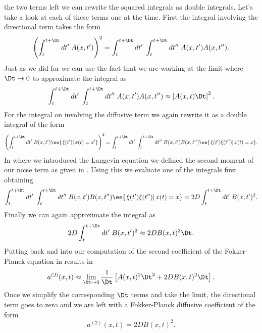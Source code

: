 the two terms left we can rewrite the squared integrals as double integrals.
Let's take a look at each of these terms one at the time. First the integral 
involving the directional term takes the form
\begin{equation}
    \left(  
        \int_t^{t + \Dt} dt'\; A(x, t')
    \right)^2 =
    \int_t^{t + \Dt} dt'\; \int_t^{t + \Dt} dt''\;
    A(x, t') A(x, t'').
\end{equation}
Just as we did for  we can use the fact that we
are working at the limit where $\Dt \rightarrow 0$ to approximate the integral
as 
\begin{equation}
    \int_t^{t + \Dt} dt'\; \int_t^{t + \Dt} dt''\;
    A(x, t') A(x, t'') \approx \left[ A(x, t)  \Dt\right]^2.
    \label{eq_directional_int_approx}
\end{equation}
For the integral on  involving the diffusive term we again
rewrite it as a double integral of the form
\begin{equation}
    \left(
    \int_t^{t + \Dt} dt'\; B(x, t') \ee{\left.\xi(t')
    \right\vert x(t) = x'}
    \right)^2 =
    \int_t^{t + \Dt} dt'\; \int_t^{t + \Dt} dt''\;
    B(x, t') B(x, t'') \ee{\left. \xi(t') \xi(t'') \right\vert x(t) = x}.
\end{equation}
In  where we introduced the Langevin equation we
defined the second moment of our noise term as given in .
Using this we evaluate one of the integrals first obtaining
\begin{equation}
    \int_t^{t + \Dt} dt'\; \int_t^{t + \Dt} dt''\;
    B(x, t') B(x, t'') \ee{\left. \xi(t') \xi(t'') \right\vert x(t) = x} =
    2D \int_t^{t + \Dt} dt'\; B(x, t')^2.
\end{equation}
Finally we can again approximate the integral as
\begin{equation}
    2D \int_t^{t + \Dt} dt'\; B(x, t')^2 \approx 2D B(x, t)^2 \Dt.
    \label{eq_diffusive_int_approx}
\end{equation}
Putting back  and
 into our computation of the second coefficient
of the Fokker-Planck equation in  results in
\begin{equation}
    a^{(2)}(x, t) \approx \lim_{\Dt \rightarrow 0} {1 \over \Dt}
    \left[ A(x, t)^2\Dt^2 + 2D B(x, t)^2\Dt \right].
\end{equation}
Once we simplify the corresponding $\Dt$ terms and take the limit, the
directional term goes to zero and we are left with a Fokker-Planck diffusive
coefficient of the form
\begin{equation}
    a^{(2)}(x, t) = 2D B(x, t)^2.
\end{equation}